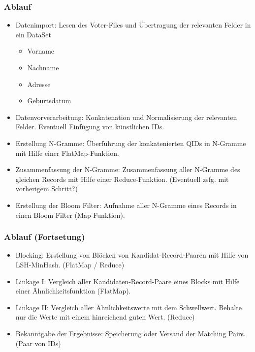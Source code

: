\documentclass{beamer}
\begin{document}
    \begin{frame}
    		\frametitle{Ablauf}  

		\begin{itemize}
			\item Datenimport: Lesen des Voter-Files und Übertragung der relevanten Felder in
			 ein DataSet
			\begin{itemize}
				\item Vorname
				\item Nachname
				\item Adresse
				\item Geburtsdatum
			\end{itemize}
			\item Datenvorverarbeitung: Konkatenation und Normalisierung der relevanten
			 Felder. Eventuell Einfügung von künstlichen IDs.
			\item Erstellung N-Gramme: Überführung der konkatenierten QIDs in N-Gramme mit
			 Hilfe einer FlatMap-Funktion.
			\item Zusammenfassung der N-Gramme: Zusammenfassung aller N-Gramme des
			 gleichen Records mit Hilfe einer Reduce-Funktion. (Eventuell zsfg. mit vorherigem
			  Schritt?)
			\item Erstellung der Bloom Filter: Aufnahme aller N-Gramme eines Records in einen
			 Bloom Filter (Map-Funktion).
		\end{itemize}
		
    \end{frame}

    \begin{frame}
    		\frametitle{Ablauf (Fortsetung)}
    
    		\begin{itemize}
        		\item Blocking: Erstellung von Blöcken von Kandidat-Record-Paaren mit Hilfe von
        		 LSH-MinHash. (FlatMap / Reduce)
			\item Linkage I: Vergleich aller Kandidaten-Record-Paare eines Blocks mit Hilfe einer
			 Ähnlichkeitsfunktion (FlatMap).
			\item Linkage II: Vergleich aller Ähnlichkeitswerte mit dem Schwellwert. Behalte nur
			 die Werte mit einem hinreichend guten Wert. (Reduce)
			\item Bekanntgabe der Ergebnisse: Speicherung oder Versand der Matching Pairs.
			 (Paar von IDs)
		\end{itemize}
    \end{frame}
\end{document}
